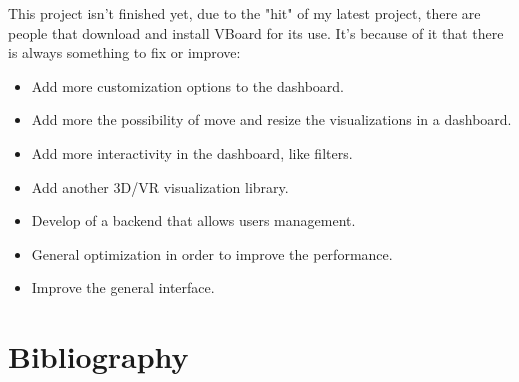 \documentclass[a4paper, 12pt]{book}
\begin{document}
This project isn't finished yet, due to the "hit" of my latest project, there are people that download and install VBoard for its use. It's because of it that there is always something to fix or improve:

\begin{itemize}
\item Add more customization options to the dashboard.
\item Add more the possibility of move and resize the visualizations in a dashboard.
\item Add more interactivity in the dashboard, like filters.
\item Add another 3D/VR visualization library.
\item Develop of a backend that allows users management.
\item General optimization in order to improve the performance.
\item Improve the general interface.
\end{itemize}




\chapter{Bibliography}
\label{sec:bib}
\end{document}
